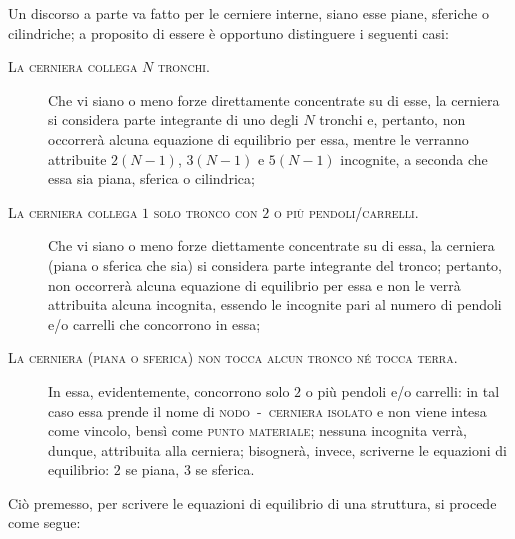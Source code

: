 \noindent Un discorso a parte va fatto per le cerniere interne, siano esse piane, sferiche o cilindriche; a proposito di essere è opportuno distinguere i seguenti casi: 
\begin{description}
\item[\textsc{La cerniera collega} $N$ \textsc{tronchi}.] Che vi siano o meno forze direttamente concentrate su di esse, la cerniera si considera parte integrante di uno degli $N$ tronchi e, pertanto, non occorrerà alcuna equazione di equilibrio per essa, mentre le verranno attribuite $2(N-1)$, $3(N-1)$ e $5(N-1)$ incognite, a seconda che essa sia piana, sferica o cilindrica;
\item[\textsc{La cerniera collega} $1$ \textsc{solo tronco con} $2$ \textsc{o più pendoli/carrelli}.] Che vi siano o meno forze diettamente concentrate su di essa, la cerniera (piana o sferica che sia) si considera parte integrante del tronco; pertanto, non occorrerà alcuna equazione di equilibrio per essa e non le verrà attribuita alcuna incognita, essendo le incognite pari al numero di pendoli e/o carrelli che concorrono in essa;
\item[\textsc{La cerniera (piana o sferica) non tocca alcun tronco né tocca terra}.] In essa, evidentemente, concorrono solo $2$ o più pendoli e/o carrelli: in tal caso essa prende il nome di \textsc{nodo}~-~\textsc{cerniera isolato} e non viene intesa come vincolo, bensì come \textsc{punto materiale}; nessuna incognita verrà, dunque, attribuita alla cerniera; bisognerà, invece, scriverne le equazioni di equilibrio: $2$ se piana, $3$ se sferica.
\end{description}
Ciò premesso, per scrivere le equazioni di equilibrio di una struttura, si procede come segue:
